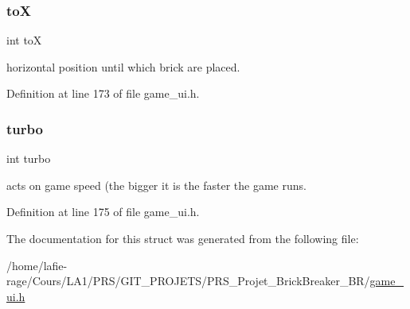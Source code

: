 \subsubsection{\texorpdfstring{toX}{toX}}
{\footnotesize\ttfamily int toX}

horizontal position until which brick are placed. 

Definition at line 173 of file game\+\_\+ui.\+h.

\mbox{\label{structgame__t_aee78eaf1a5ef0225bf8f0d146becc1ca}} 
\subsubsection{\texorpdfstring{turbo}{turbo}}
{\footnotesize\ttfamily int turbo}

acts on game speed (the bigger it is the faster the game runs. 

Definition at line 175 of file game\+\_\+ui.\+h.



The documentation for this struct was generated from the following file\+:\begin{DoxyCompactItemize}
\item 
/home/lafie-\/rage/\+Cours/\+L\+A1/\+P\+R\+S/\+G\+I\+T\+\_\+\+P\+R\+O\+J\+E\+T\+S/\+P\+R\+S\+\_\+\+Projet\+\_\+\+Brick\+Breaker\+\_\+\+B\+R/\hyperlink{game__ui_8h}{game\+\_\+ui.\+h}\end{DoxyCompactItemize}
